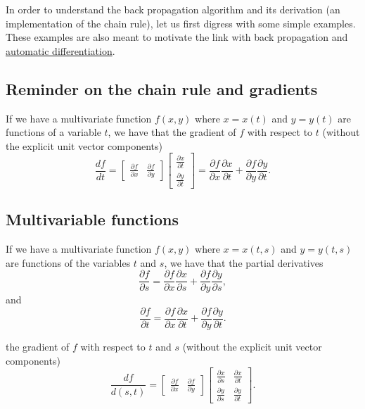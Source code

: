 \documentclass[%
oneside,                 %
final,                   %
10pt]{article}
\begin{document}
In order to understand the back propagation algorithm and its
derivation (an implementation of the chain rule), let us first digress
with some simple examples. These examples are also meant to motivate
the link with back propagation and \href{{https://en.wikipedia.org/wiki/Automatic_differentiation}}{automatic differentiation}.

\subsection{Reminder on the chain rule and gradients}

If we have a multivariate function $f(x,y)$ where $x=x(t)$ and $y=y(t)$ are functions of a variable $t$, we have that the gradient of $f$ with respect to $t$ (without the explicit unit vector components)
\[
\frac{df}{dt} = \begin{bmatrix}\frac{\partial f}{\partial x} & \frac{\partial f}{\partial y} \end{bmatrix} \begin{bmatrix}\frac{\partial x}{\partial t} \\ \frac{\partial y}{\partial t} \end{bmatrix}=\frac{\partial f}{\partial x} \frac{\partial x}{\partial t} +\frac{\partial f}{\partial y} \frac{\partial y}{\partial t}. 
\]

\subsection{Multivariable functions}

If we have a multivariate function $f(x,y)$ where $x=x(t,s)$ and $y=y(t,s)$ are functions of the variables $t$ and $s$, we have that the partial derivatives
\[
\frac{\partial f}{\partial s}=\frac{\partial f}{\partial x}\frac{\partial x}{\partial s}+\frac{\partial f}{\partial y}\frac{\partial y}{\partial s},
\]
and
\[
\frac{\partial f}{\partial t}=\frac{\partial f}{\partial x}\frac{\partial x}{\partial t}+\frac{\partial f}{\partial y}\frac{\partial y}{\partial t}.
\]

the gradient of $f$ with respect to $t$ and $s$ (without the explicit unit vector components)
\[
\frac{df}{d(s,t)} = \begin{bmatrix}\frac{\partial f}{\partial x} & \frac{\partial f}{\partial y} \end{bmatrix} \begin{bmatrix}\frac{\partial x}{\partial s}  &\frac{\partial x}{\partial t} \\ \frac{\partial y}{\partial s} & \frac{\partial y}{\partial t} \end{bmatrix}.
\]
\end{document}

